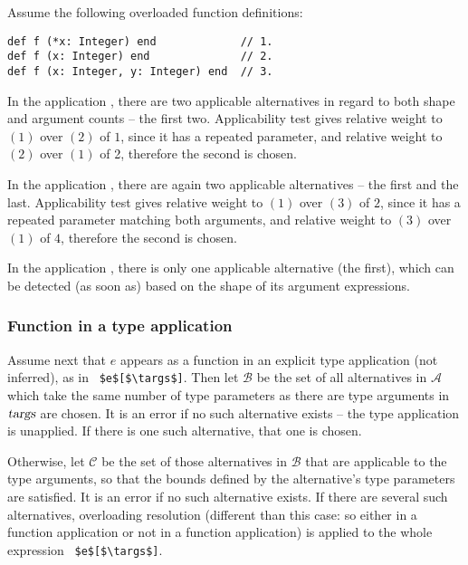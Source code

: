 \example Assume the following overloaded function definitions:
\begin{lstlisting}
def f (*x: Integer) end             // 1.
def f (x: Integer) end              // 2.
def f (x: Integer, y: Integer) end  // 3.
\end{lstlisting}

In the application , there are two applicable alternatives in regard to both shape and argument counts -- the first two. Applicability test gives relative weight to $(1)$ over $(2)$ of $1$, since it has a repeated parameter, and relative weight to $(2)$ over $(1)$ of 2, therefore the second is chosen. 

In the application , there are again two applicable alternatives -- the first and the last. Applicability test gives relative weight to $(1)$ over $(3)$ of $2$, since it has a repeated parameter matching both arguments, and relative weight to $(3)$ over $(1)$ of $4$, therefore the second is chosen. 

In the application , there is only one applicable alternative (the first), which can be detected (as soon as) based on the shape of its argument expressions. 






\subsubsection{Function in a type application}

Assume next that $e$ appears as a function in an explicit type application (not inferred), as in ~\lstinline!$e$[$\targs$]!. Then let $\mathcal{B}$ be the set of all alternatives in $\mathcal{A}$ which take the same number of type parameters as there are type arguments in $\mbox{\sl targs}$ are chosen. It is an error if no such alternative exists -- the type application is unapplied. If there is one such alternative, that one is chosen. 

Otherwise, let $\mathcal{C}$ be the set of those alternatives in $\mathcal{B}$ that are applicable to the type arguments, so that the bounds defined by the alternative's type parameters are satisfied. It is an error if no such alternative exists. If there are several such alternatives, overloading resolution (different than this case: so either in a function application or not in a function application) is applied to the whole expression ~\lstinline!$e$[$\targs$]!. 






